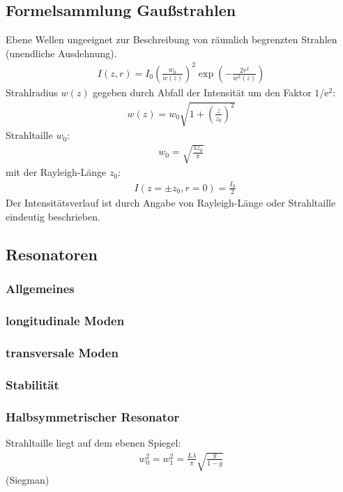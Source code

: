 \documentclass[11pt, a4paper]{article}
\numberwithin{equation}{section}
\begin{document}
\subsection{Formelsammlung Gaußstrahlen \cite{linden}}
\label{gaussstrahlen}
Ebene Wellen ungeeignet zur Beschreibung von räumlich begrenzten Strahlen (unendliche Ausdehnung).
\begin{align}
	I(z,r) = I_0 \left( \frac{w_0}{w(z)} \right)^2 \exp\left(- \frac{2 r^2}{w^2(z)} \right)
\end{align}
Strahlradius $w(z)$ gegeben durch Abfall der Intensität um den Faktor $1/\mathrm{e}^2$:
\begin{align}
	w(z) = w_0 \sqrt{1 + \left( \frac{z}{z_0} \right)^2}
	\label{eq:gauss_axialprofil}
\end{align}
Strahltaille $w_0$:
\begin{align}
	w_0 = \sqrt{\frac{\lambda z_0}{\pi}}
	\label{eq:rayleigh_laenge}
\end{align}
mit der Rayleigh-Länge $z_0$:
\begin{align}
	&I(z = \pm z_0, r =0) = \frac{I_0}{2}
\end{align}
Der Intensitätsverlauf ist durch Angabe von Rayleigh-Länge oder Strahltaille eindeutig beschrieben.

\subsection{Resonatoren}
\subsubsection{Allgemeines}
\subsubsection{longitudinale Moden}
\subsubsection{transversale Moden}
\subsubsection{Stabilität}
\subsubsection{Halbsymmetrischer Resonator}
Strahltaille liegt auf dem ebenen Spiegel:
\begin{align}
	w_0^2 = w_1^2 = \frac{L \lambda}{\pi} \sqrt{\frac{g}{1 - g}}
	\label{eq:strahltaille_halbsym}
\end{align} (Siegman)
\end{document}
